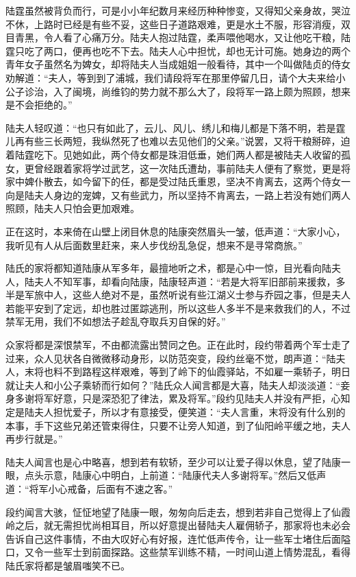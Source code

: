 陆霆虽然被背负而行，可是小小年纪数月来经历种种惨变，又得知父亲身故，哭泣不休，上路时已经是有些不妥，这些日子道路艰难，更是水土不服，形容消瘦，双目青黑，令人看了心痛万分。陆夫人抱过陆霆，柔声喂他喝水，又让他吃干粮，陆霆只吃了两口，便再也吃不下去。陆夫人心中担忧，却也无计可施。她身边的两个青年女子虽然名为婢女，却将陆夫人当成姐姐一般看待，其中一个叫做陆贞的侍女劝解道：“夫人，等到到了浦城，我们请段将军在那里停留几日，请个大夫来给小公子诊治，入了闽境，尚维钧的势力就不那么大了，段将军一路上颇为照顾，想来是不会拒绝的。”

陆夫人轻叹道：“也只有如此了，云儿、风儿、绣儿和梅儿都是下落不明，若是霆儿再有些三长两短，我纵然死了也难以去见他们的父亲。”说罢，又将干粮掰碎，迫着陆霆吃下。见她如此，两个侍女都是珠泪低垂，她们两人都是被陆夫人收留的孤女，更曾经跟着家将学过武艺，这一次陆氏遭劫，事前陆夫人便有了察觉，更是将家中婢仆散去，如今留下的任，都是受过陆氏重恩，坚决不肯离去，这两个侍女一向是陆夫人身边的宠婢，又有些武力，所以坚持不肯离去，一路上若没有她们两人照顾，陆夫人只怕会更加艰难。

正在这时，本来倚在山壁上闭目休息的陆康突然眉头一皱，低声道：“大家小心，我听见有人从后面数里赶来，来人步伐纷乱急促，想来不是寻常商旅。”

陆氏的家将都知道陆康从军多年，最擅地听之术，都是心中一惊，目光看向陆夫人，陆夫人不知军事，却看向陆康，陆康轻声道：“若是大将军旧部前来援救，多半是军旅中人，这些人绝对不是，虽然听说有些江湖义士参与乔园之事，但是夫人若能平安到了定远，却也胜过匿踪逃刑，所以这些人多半不是来救我们的人，不过禁军无用，我们不如想法子趁乱夺取兵刃自保的好。”

众家将都是深恨禁军，不由都流露出赞同之色。正在此时，段约带着两个军士走了过来，众人见状各自微微移动身形，以防范突变，段约丝毫不觉，朗声道：“陆夫人，末将也料不到路程这样艰难，等到了岭下的仙霞驿站，不如雇一乘轿子，明日就让夫人和小公子乘轿而行如何？”陆氏众人闻言都是大喜，陆夫人却淡淡道：“妾身多谢将军好意，只是深恐犯了律法，累及将军。”段约见陆夫人并没有严拒，心知定是陆夫人担忧爱子，所以才有意接受，便笑道：“夫人言重，末将没有什么别的本事，手下这些兄弟还管束得住，只要不让旁人知道，到了仙阳岭平缓之地，夫人再步行就是。”

陆夫人闻言也是心中略喜，想到若有软轿，至少可以让爱子得以休息，望了陆康一眼，点头示意，陆康心中明白，上前道：“陆康代夫人多谢将军。”然后又低声道：“将军小心戒备，后面有不速之客。”

段约闻言大骇，怔怔地望了陆康一眼，匆匆向后走去，想到若非自己觉得上了仙霞岭之后，就无需担忧尚相耳目，所以好意提出替陆夫人雇佣轿子，那家将也未必会告诉自己这件事情，不由大叹好心有好报，连忙低声传令，让一些军士堵住后面隘口，又令一些军士到前面探路。这些禁军训练不精，一时间山道上情势混乱，看得陆氏家将都是皱眉嗤笑不已。

